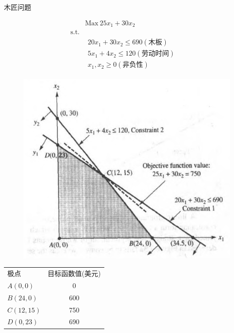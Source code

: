 \documentclass[UTF8]{ctexbeamer}
\begin{document}
\begin{frame}{木匠问题}
  \begin{figure}
    \begin{minipage}{.5\linewidth}
      \[ 
      \begin{array}{lcl}
        & \mbox{Max}\ 25x_1 + 30x_2 & \\
        \mbox{s.t.} & &  \\
        &
        \begin{array}{c}
          20x_1 + 30x_2 \le 690 (\text{木板})\\
          5x_1 + 4x_2 \le 120 (\text{劳动时间})\\
          x_1, x_2 \ge 0 (\text{非负性})
        \end{array}
        &
      \end{array}
      \]
    \end{minipage}%
    \begin{minipage}{.5\linewidth}
      \includegraphics[width=\textwidth{}]{wood.png}    
    \end{minipage}
  \end{figure}
  \begin{table}
    \centering
    \begin{tabular}{lc}
      极点 & 目标函数值(美元)\\[-5pt]
      $A(0, 0)$ & 0 \\[-5pt]
      $B(24, 0)$ & 600 \\[-5pt]
      $C(12, 15)$ & 750 \\[-5pt]
      $D(0, 23)$ & 690
    \end{tabular}
  \end{table}
  
\end{frame}
\end{document}
